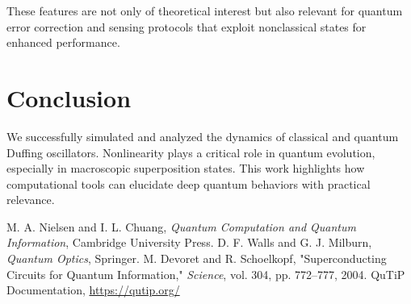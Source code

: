\documentclass[conference]{IEEEtran}
\begin{document}
These features are not only of theoretical interest but also relevant for quantum error correction and sensing protocols that exploit nonclassical states for enhanced performance.

\section{Conclusion}
We successfully simulated and analyzed the dynamics of classical and quantum Duffing oscillators. Nonlinearity plays a critical role in quantum evolution, especially in macroscopic superposition states. This work highlights how computational tools can elucidate deep quantum behaviors with practical relevance.

\begin{thebibliography}{00}
 M. A. Nielsen and I. L. Chuang, \textit{Quantum Computation and Quantum Information}, Cambridge University Press.
 D. F. Walls and G. J. Milburn, \textit{Quantum Optics}, Springer.
 M. Devoret and R. Schoelkopf, "Superconducting Circuits for Quantum Information," \textit{Science}, vol. 304, pp.  772--777, 2004.
 QuTiP Documentation, \url{https://qutip.org/}
\end{thebibliography}
\end{document}
